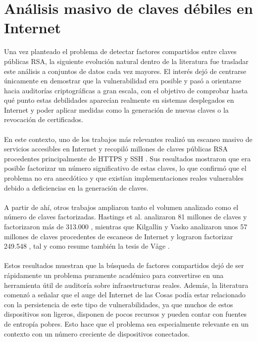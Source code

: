 \section{Análisis masivo de claves débiles en Internet}

Una vez planteado el problema de detectar factores compartidos entre claves públicas RSA, la siguiente evolución natural dentro de la literatura fue trasladar este análisis a conjuntos de datos cada vez mayores. El interés dejó de centrarse únicamente en demostrar que la vulnerabilidad era posible y pasó a orientarse hacia auditorías criptográficas a gran escala, con el objetivo de comprobar hasta qué punto estas debilidades aparecían realmente en sistemas desplegados en Internet y poder aplicar medidas como la generación de nuevas claves o la revocación de certificados.
\\
\\
En este contexto, uno de los trabajos más relevantes realizó un escaneo masivo de servicios accesibles en Internet y recopiló millones de claves públicas RSA procedentes principalmente de HTTPS y SSH \citep{heninger2012mining}. Sus resultados mostraron que era posible factorizar un número significativo de estas claves, lo que confirmó que el problema no era anecdótico y que existían implementaciones reales vulnerables debido a deficiencias en la generación de claves.
\\
\\
A partir de ahí, otros trabajos ampliaron tanto el volumen analizado como el número de claves factorizadas. Hastings et al. analizaron 81 millones de claves y factorizaron más de 313.000 \citep{hastings2016weak}, mientras que Kilgallin y Vasko analizaron unos 57 millones de claves procedentes de escaneos de Internet y lograron factorizar 249.548 \citep{kilgallin2019factoring}, tal y como resume también la tesis de Våge \citep{vage2022finding}.
\\
\\
Estos resultados muestran que la búsqueda de factores compartidos dejó de ser rápidamente un problema puramente académico para convertirse en una herramienta útil de auditoría sobre infraestructuras reales. Además, la literatura comenzó a señalar que el auge del Internet de las Cosas podía estar relacionado con la persistencia de este tipo de vulnerabilidades, ya que muchos de estos dispositivos son ligeros, disponen de pocos recursos y pueden contar con fuentes de entropía pobres. Esto hace que el problema sea especialmente relevante en un contexto con un número creciente de dispositivos conectados.
